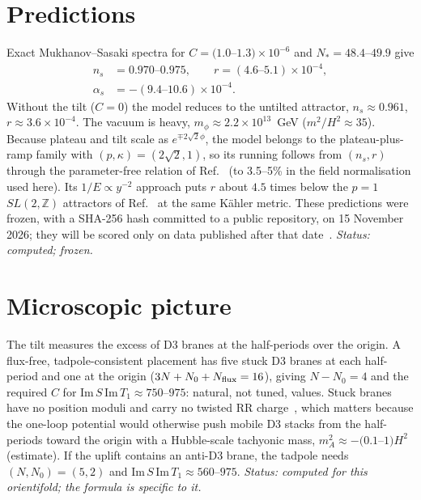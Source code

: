 \documentclass[aps,prd,twocolumn,superscriptaddress,nofootinbib,showkeys]{revtex4-2}
\begin{document}
\section{Predictions}
Exact Mukhanov--Sasaki spectra for $C=(1.0$--$1.3)\times10^{-6}$ and $N_*=48.4$--$49.9$ give
\begin{align}
n_s&=0.970\text{--}0.975,\qquad r=(4.6\text{--}5.1)\times10^{-4},\nonumber\\
\alpha_s&=-(9.4\text{--}10.6)\times10^{-4}.
\end{align}
Without the tilt ($C=0$) the model reduces to the untilted attractor, $n_s\approx0.961$, $r\approx3.6\times10^{-4}$. The vacuum is heavy, $m_\phi\approx2.2\times10^{13}$~GeV ($m^2/H^2\approx35$). Because plateau and tilt scale as $e^{\mp2\sqrt2\phi}$, the model belongs to the plateau-plus-ramp family with $(p,\kappa)=(2\sqrt2,1)$, so its running follows from $(n_s,r)$ through the parameter-free relation of Ref.~\cite{P1} (to 3.5--5\% in the field normalisation used here). Its $1/E\propto y^{-2}$ approach puts $r$ about $4.5$ times below the $p=1$ $SL(2,\mathbb{Z})$ attractors of Ref.~\cite{KLsl2z} at the same K\"ahler metric. These predictions were frozen, with a SHA-256 hash committed to a public repository, on 15 November 2026; they will be scored only on data published after that date~\cite{SERAPIS}. \emph{Status: computed; frozen.}

\section{Microscopic picture}
The tilt measures the excess of D3 branes at the half-periods over the origin. A flux-free, tadpole-consistent placement has five stuck D3 branes at each half-period and one at the origin ($3N+N_0+N_{\rm flux}=16$), giving $N-N_0=4$ and the required $C$ for $\mathrm{Im}\,S\,\mathrm{Im}\,T_1\approx750$--$975$: natural, not tuned, values. Stuck branes have no position moduli and carry no twisted RR charge~\cite{MSS}, which matters because the one-loop potential would otherwise push mobile D3 stacks from the half-periods toward the origin with a Hubble-scale tachyonic mass, $m_A^2\approx-(0.1$--$1)H^2$ (estimate). If the uplift contains an anti-D3 brane, the tadpole needs $(N,N_0)=(5,2)$ and $\mathrm{Im}\,S\,\mathrm{Im}\,T_1\approx560$--$975$. \emph{Status: computed for this orientifold; the formula is specific to it.}
\end{document}
